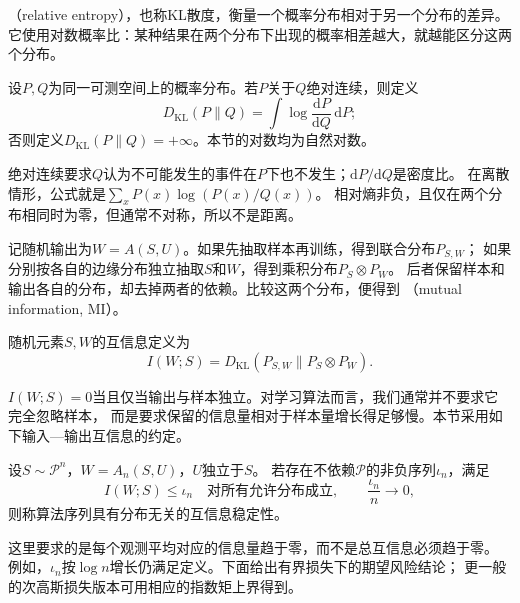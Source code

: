 （relative entropy），也称KL散度，衡量一个概率分布相对于另一个分布的差异。
它使用对数概率比：某种结果在两个分布下出现的概率相差越大，就越能区分这两个分布。

\begin{definition}[相对熵]
\label{def:stability-relative-entropy}
设$P,Q$为同一可测空间上的概率分布。若$P$关于$Q$绝对连续，则定义
\[
 D_{\mathrm{KL}}(P\|Q)=\int\log\frac{\mathrm dP}{\mathrm dQ}\,\mathrm dP;
\]
否则定义$D_{\mathrm{KL}}(P\|Q)=+\infty$。本节的对数均为自然对数。
\end{definition}

绝对连续要求$Q$认为不可能发生的事件在$P$下也不发生；$\mathrm dP/\mathrm dQ$是密度比。
在离散情形，公式就是$\sum_x P(x)\log(P(x)/Q(x))$。
相对熵非负，且仅在两个分布相同时为零，但通常不对称，所以不是距离。

记随机输出为$W=A(S,U)$。如果先抽取样本再训练，得到联合分布$P_{S,W}$；
如果分别按各自的边缘分布独立抽取$S$和$W$，得到乘积分布$P_S\otimes P_W$。
后者保留样本和输出各自的分布，却去掉两者的依赖。比较这两个分布，便得到
（mutual information, MI）。

\begin{definition}[互信息]
\label{def:stability-mutual-information}
随机元素$S,W$的互信息定义为
\[
 I(W;S)=D_{\mathrm{KL}}(P_{S,W}\|P_S\otimes P_W).
\]
\end{definition}

$I(W;S)=0$当且仅当输出与样本独立。对学习算法而言，我们通常并不要求它完全忽略样本，
而是要求保留的信息量相对于样本量增长得足够慢。本节采用如下输入—输出互信息的约定。

\begin{definition}[互信息稳定性]
\label{def:mutual-information-stability}
设$S\sim\mathcal P^n$，$W=A_n(S,U)$，$U$独立于$S$。
若存在不依赖$\mathcal P$的非负序列$\iota_n$，满足
\[
 I(W;S)\leq\iota_n\quad\text{对所有允许分布成立},
 \qquad \frac{\iota_n}{n}\longrightarrow0,
\]
则称算法序列具有分布无关的互信息稳定性。
\end{definition}

这里要求的是每个观测平均对应的信息量趋于零，而不是总互信息必须趋于零。
例如，$\iota_n$按$\log n$增长仍满足定义。下面给出有界损失下的期望风险结论；
更一般的次高斯损失版本可用相应的指数矩上界得到。

